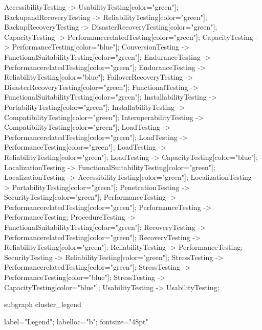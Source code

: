 \documentclass{article}
\begin{document}
{AccessibilityTesting -> UsabilityTesting[color="green"];
BackupandRecoveryTesting -> ReliabilityTesting[color="green"];
BackupRecoveryTesting -> DisasterRecoveryTesting[color="green"];
CapacityTesting -> PerformancerelatedTesting[color="green"];
CapacityTesting -> PerformanceTesting[color="blue"];
ConversionTesting -> FunctionalSuitabilityTesting[color="green"];
EnduranceTesting -> PerformancerelatedTesting[color="green"];
EnduranceTesting -> ReliabilityTesting[color="blue"];
FailoverRecoveryTesting -> DisasterRecoveryTesting[color="green"];
FunctionalTesting -> FunctionalSuitabilityTesting[color="green"];
InstallabilityTesting -> PortabilityTesting[color="green"];
InstallabilityTesting -> CompatibilityTesting[color="green"];
InteroperabilityTesting -> CompatibilityTesting[color="green"];
LoadTesting -> PerformancerelatedTesting[color="green"];
LoadTesting -> PerformanceTesting[color="green"];
LoadTesting -> ReliabilityTesting[color="green"];
LoadTesting -> CapacityTesting[color="blue"];
LocalizationTesting -> FunctionalSuitabilityTesting[color="green"];
LocalizationTesting -> AccessibilityTesting[color="green"];
LocalizationTesting -> PortabilityTesting[color="green"];
PenetrationTesting -> SecurityTesting[color="green"];
PerformanceTesting -> PerformancerelatedTesting[color="green"];
PerformanceTesting -> PerformanceTesting;
ProcedureTesting -> FunctionalSuitabilityTesting[color="green"];
RecoveryTesting -> PerformancerelatedTesting[color="green"];
RecoveryTesting -> ReliabilityTesting[color="green"];
ReliabilityTesting -> PerformanceTesting;
SecurityTesting -> ReliabilityTesting[color="green"];
StressTesting -> PerformancerelatedTesting[color="green"];
StressTesting -> PerformanceTesting[color="blue"];
StressTesting -> CapacityTesting[color="blue"];
UsabilityTesting -> UsabilityTesting;

subgraph cluster_legend {

    label="Legend";
    labelloc="b";
    fontsize="48pt"

}}
\end{document}
